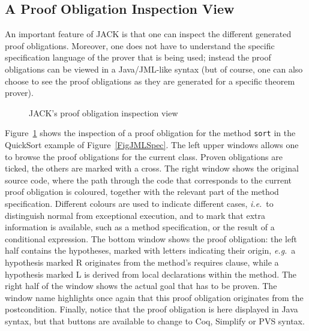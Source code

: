 \subsection{A Proof Obligation Inspection View}

An important feature of JACK is that one can inspect the different
generated proof obligations. Moreover, one does not have to understand
the specific specification language of the prover that is being used;
instead the proof obligations can be viewed in a Java/JML-like syntax
(but of course, one can also choose to see the proof obligations as
they are generated for a specific theorem prover).

\begin{figure}[t!]
\caption{JACK's proof obligation inspection view}\label{FigJackView}
\end{figure}


Figure~\ref{FigJackView} shows the inspection of a proof obligation
for the method \texttt{sort} in the QuickSort example of
Figure~\ref{FigJMLSpec}. The left upper windows allows one to browse
the proof obligations for the current class. Proven obligations are
ticked, the others are marked with a cross. The right window shows the
original source code, where the path through the code that corresponds
to the current proof obligation is coloured, together with the
relevant part of the method specification. Different colours are used
to indicate different cases, \emph{i.e.}\ to distinguish normal from
exceptional execution, and to mark that extra information is
available, such as a method specification, or the result of a
conditional expression.  The bottom window shows the proof obligation:
the left half contains the hypotheses, marked with letters indicating
their origin, \emph{e.g.}\ a hypothesis marked R originates from the
method's requires clause, while a hypothesis marked L is derived from
local declarations within the method. The right half of the window
shows the actual goal that has to be proven. The window name
highlights once again that this proof obligation originates from the
postcondition. Finally, notice that the proof obligation is here
displayed in Java syntax, but that buttons are available to change to
Coq, Simplify or PVS syntax.

